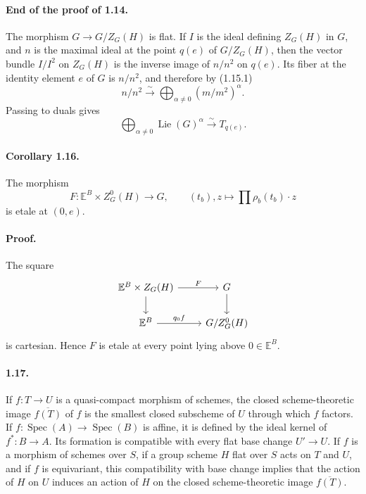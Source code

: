 \documentclass[11pt]{article}
\newcommand{\Lie}{\operatorname{Lie}}
\newcommand{\Spec}{\operatorname{Spec}}
\newcommand{\xiso}{\xrightarrow{\sim}}
\theoremstyle{plain}
\theoremstyle{definition}
\begin{document}
\paragraph{End of the proof of 1.14.} The morphism $G\to G/Z_G(H)$ is flat. If $I$ is the ideal defining $Z_G(H)$ in $G$, and $n$ is the maximal ideal at the point $q(e)$ of $G/Z_G(H)$, then the vector bundle $I/I^2$ on $Z_G(H)$ is the inverse image of $n/n^2$ on $q(e)$. Its fiber at the identity element $e$ of $G$ is $n/n^2$, and therefore by (1.15.1)
\[
   n/n^2\xiso{}\bigoplus_{\alpha\ne0}(m/m^2)^\alpha.
\]
Passing to duals gives
\[
   \bigoplus_{\alpha\ne0}\Lie(G)^\alpha\xiso{}T_{q(e)}.
\]

\paragraph{Corollary 1.16.} The morphism
\[
   F:\mathbb E^B\times Z^0_G(H)\longrightarrow G,
   \qquad (t_b),z\longmapsto \prod \rho_b(t_b)\cdot z
\]
is etale at $(0,e)$.

\paragraph{Proof.} The square
\[
\begin{tikzcd}
\mathbb E^B\times Z_G(H) \arrow[r,"F"] \arrow[d] & G \arrow[d] \\
\mathbb E^B \arrow[r,"q_0f"] & G/Z^0_G(H)
\end{tikzcd}
\]
is cartesian. Hence $F$ is etale at every point lying above $0\in\mathbb E^B$.

\paragraph{1.17.} If $f:T\to U$ is a quasi-compact morphism of schemes, the closed scheme-theoretic image $\overline{f(T)}$ of $f$ is the smallest closed subscheme of $U$ through which $f$ factors. If $f:\Spec(A)\to\Spec(B)$ is affine, it is defined by the ideal kernel of $f^*:B\to A$. Its formation is compatible with every flat base change $U'\to U$. If $f$ is a morphism of schemes over $S$, if a group scheme $H$ flat over $S$ acts on $T$ and $U$, and if $f$ is equivariant, this compatibility with base change implies that the action of $H$ on $U$ induces an action of $H$ on the closed scheme-theoretic image $\overline{f(T)}$.
\end{document}
